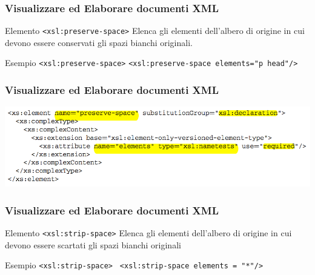 \begin{frame}
    \frametitle{Visualizzare ed Elaborare documenti XML}
    \addtocounter{nframe}{1}
    

     \begin{block}{Elemento \texttt{<xsl:preserve-space>}}
         Elenca gli elementi dell'albero di origine in cui devono essere conservati gli spazi bianchi originali.
     \end{block}

     \begin{block}{Esempio \texttt{<xsl:preserve-space>}}
        \texttt{<xsl:preserve-space elements="p head"/>}
    \end{block}

\end{frame}

\begin{frame}
    \frametitle{Visualizzare ed Elaborare documenti XML}
    \addtocounter{nframe}{1}
    
    \begin{center}
        \includegraphics[width=.9\textwidth]{imgs/Schema-preserve-space.png}
    \end{center}

\end{frame}


\begin{frame}
    \frametitle{Visualizzare ed Elaborare documenti XML}
    \addtocounter{nframe}{1}
    

     \begin{block}{Elemento \texttt{<xsl:strip-space>}}
        Elenca gli elementi dell'albero di origine in cui devono essere scartati gli spazi bianchi originali
     \end{block}

     \begin{block}{Esempio \texttt{<xsl:strip-space>}}
       \texttt{ <xsl:strip-space elements = "*"/>}
     \end{block}

\end{frame}

